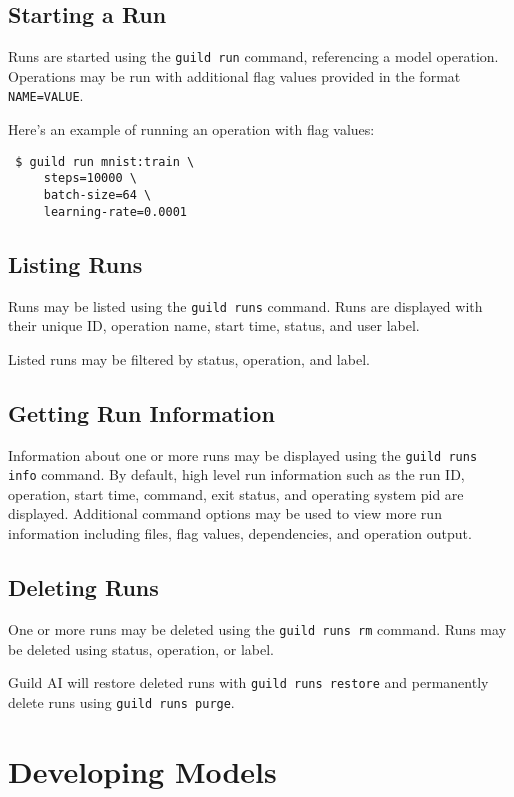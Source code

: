 \documentclass{article}
\begin{document}
\subsection{Starting a Run}

Runs are started using the \verb|guild run| command, referencing a
model operation. Operations may be run with additional flag values
provided in the format \verb|NAME=VALUE|.

Here's an example of running an operation with flag values:

{\footnotesize
\begin{verbatim}
 $ guild run mnist:train \
     steps=10000 \
     batch-size=64 \
     learning-rate=0.0001
\end{verbatim}}

\subsection{Listing Runs}

Runs may be listed using the \verb|guild runs| command. Runs are
displayed with their unique ID, operation name, start time, status,
and user label.

Listed runs may be filtered by status, operation, and label.

\subsection{Getting Run Information}

Information about one or more runs may be displayed using the
\verb|guild runs info| command. By default, high level run information
such as the run ID, operation, start time, command, exit status, and
operating system pid are displayed. Additional command options may be
used to view more run information including files, flag values,
dependencies, and operation output.

\subsection{Deleting Runs}

One or more runs may be deleted using the \verb|guild runs rm|
command. Runs may be deleted using status, operation, or label.

Guild AI will restore deleted runs with \verb|guild runs restore| and
permanently delete runs using \verb|guild runs purge|.

\section{Developing Models}
\end{document}
